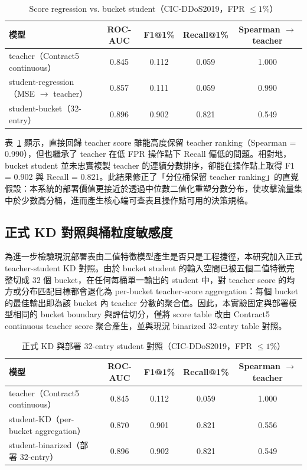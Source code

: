 \documentclass[12pt, a4paper, fontset=none]{ctexart}
\begin{document}
\begin{table}[H]
  \centering
  \caption{Score regression vs. bucket student（CIC-DDoS2019，FPR $\leq 1\%$）}
  \label{tab:regression-vs-bucket}
  \renewcommand{\arraystretch}{1.2}
  \begin{tabular}{l c c c c}
    \toprule
    \textbf{模型} & ROC-AUC & F1@1\% & Recall@1\% & Spearman $\rightarrow$ teacher \\
    \midrule
    teacher（Contract5 continuous） & 0.845 & 0.112 & 0.059 & 1.000 \\
    student-regression（MSE $\rightarrow$ teacher） & 0.857 & 0.111 & 0.059 & 0.990 \\
    student-bucket（32-entry） & 0.896 & 0.902 & 0.821 & 0.549 \\
    \bottomrule
  \end{tabular}
\end{table}

表~\ref{tab:regression-vs-bucket} 顯示，直接回歸 teacher score 雖能高度保留 teacher ranking（Spearman = 0.990），但也繼承了 teacher 在低 FPR 操作點下 Recall 偏低的問題。相對地，bucket student 並未忠實複製 teacher 的連續分數排序，卻能在操作點上取得 F1 = 0.902 與 Recall = 0.821。此結果修正了「分位桶保留 teacher ranking」的直覺假設：本系統的部署價值更接近於透過中位數二值化重塑分數分布，使攻擊流量集中於少數高分桶，進而產生核心端可查表且操作點可用的決策規格。

\subsection{正式 KD 對照與桶粒度敏感度}
\label{sec:kd-granularity}
為進一步檢驗現況部署表由二值特徵模型產生是否只是工程捷徑，本研究加入正式 teacher-student KD 對照。由於 bucket student 的輸入空間已被五個二值特徵完整切成 32 個 bucket，在任何每桶單一輸出的 student 中，對 teacher score 的均方或分布匹配目標都會退化為 per-bucket teacher-score aggregation：每個 bucket 的最佳輸出即為該 bucket 內 teacher 分數的聚合值。因此，本實驗固定與部署模型相同的 bucket boundary 與評估切分，僅將 score table 改由 Contract5 continuous teacher score 聚合產生，並與現況 binarized 32-entry table 對照。

\begin{table}[H]
  \centering
  \caption{正式 KD 與部署 32-entry student 對照（CIC-DDoS2019，FPR $\leq 1\%$）}
  \label{tab:formal-kd}
  \small
  \renewcommand{\arraystretch}{1.2}
  \begin{tabular}{l c c c c}
    \toprule
    \textbf{模型} & ROC-AUC & F1@1\% & Recall@1\% & Spearman $\rightarrow$ teacher \\
    \midrule
    teacher（Contract5 continuous） & 0.845 & 0.112 & 0.059 & 1.000 \\
    student-KD（per-bucket aggregation） & 0.870 & 0.901 & 0.821 & 0.556 \\
    student-binarized（部署 32-entry） & 0.896 & 0.902 & 0.821 & 0.549 \\
    \bottomrule
  \end{tabular}
\end{table}
\end{document}
